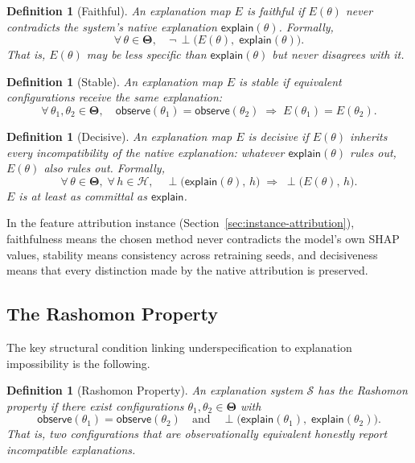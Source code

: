 \documentclass[11pt,a4paper]{article}
\newtheorem{definition}[theorem]{Definition}
\newcommand{\Params}{\mathbf{\Theta}}
\newcommand{\sH}{\mathcal{H}}
\newcommand{\incomp}{\perp}
\begin{document}
\begin{definition}[Faithful]
\label{def:faithful}
An explanation map $E$ is \emph{faithful} if $E(\theta)$ never contradicts the
system's native explanation $\mathsf{explain}(\theta)$.  Formally,
\[
  \forall\,\theta \in \Params,\quad
  \neg\,\incomp\bigl(E(\theta),\;\mathsf{explain}(\theta)\bigr).
\]
That is, $E(\theta)$ may be less specific than $\mathsf{explain}(\theta)$ but
never disagrees with it.
\end{definition}

\begin{definition}[Stable]
\label{def:stable}
An explanation map $E$ is \emph{stable} if equivalent configurations receive
the same explanation:
\[
  \forall\,\theta_1, \theta_2 \in \Params,\quad
  \mathsf{observe}(\theta_1) = \mathsf{observe}(\theta_2)
  \;\Longrightarrow\;
  E(\theta_1) = E(\theta_2).
\]
\end{definition}

\begin{definition}[Decisive]
\label{def:decisive}
An explanation map $E$ is \emph{decisive} if $E(\theta)$ inherits every
incompatibility of the native explanation: whatever
$\mathsf{explain}(\theta)$ rules out, $E(\theta)$ also rules out.  Formally,
\[
  \forall\,\theta \in \Params,\;\forall\,h \in \sH,\quad
  \incomp\bigl(\mathsf{explain}(\theta),\, h\bigr)
  \;\Longrightarrow\;
  \incomp\bigl(E(\theta),\, h\bigr).
\]
$E$ is at least as committal as $\mathsf{explain}$.
\end{definition}

In the feature attribution instance (Section~\ref{sec:instance-attribution}),
faithfulness means the chosen method never contradicts the model's own SHAP
values, stability means consistency across retraining seeds, and decisiveness
means that every distinction made by the native attribution is preserved.

\subsection{The Rashomon Property}

The key structural condition linking underspecification to explanation
impossibility is the following.

\begin{definition}[Rashomon Property]
\label{def:rashomon}
An explanation system $\mathcal{S}$ has the \emph{Rashomon property} if there
exist configurations $\theta_1, \theta_2 \in \Params$ with
\[
  \mathsf{observe}(\theta_1) = \mathsf{observe}(\theta_2)
  \quad\text{and}\quad
  \incomp\bigl(\mathsf{explain}(\theta_1),\;\mathsf{explain}(\theta_2)\bigr).
\]
That is, two configurations that are observationally equivalent honestly report
incompatible explanations.
\end{definition}
\end{document}
